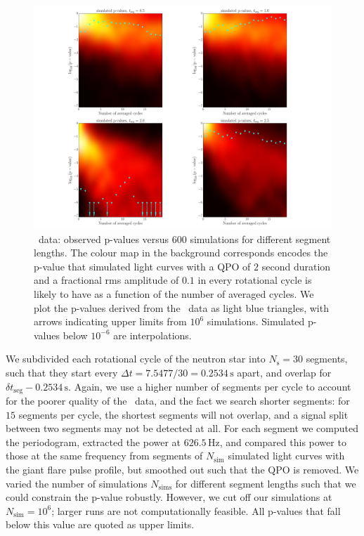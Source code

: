\documentclass{emulateapj}
\begin{document}
\begin{figure}[htbp]
\begin{center}
\includegraphics[width=1.1\textwidth]{f8.pdf}
\caption{\rhessi\ data: observed p-values versus $600$ simulations for different segment lengths. The colour map in the background corresponds encodes the p-value that simulated light curves with a QPO of $2$ second duration and a fractional rms amplitude of $0.1$ in every rotational cycle is likely to have as a function of the number of averaged cycles. We plot the p-values derived from the \rhessi\ data as light blue triangles, with arrows indicating upper limits from $10^{6}$ simulations. Simulated p-values below $10^{-6}$ are interpolations.}
\label{fig:rhessi_sims1_pvalues}
\end{center}
\end{figure}
We subdivided each rotational cycle of the neutron star into $N_\mathrm{s} = 30$ segments, such that they start every $\Delta t = 7.5477/30 = 0.2534 \, \mathrm{s}$ apart, and overlap for $\delta t_\mathrm{seg} - 0.2534 \, \mathrm{s}$. Again, we use a higher number of segments per cycle to account for the poorer quality of the \rhessi\ data, and the fact we search shorter segments: for $15$ segments per cycle, the shortest segments will not overlap, and a signal split between two segments may not be detected at all.
For each segment we computed the periodogram, extracted the power at $626.5 \, \mathrm{Hz}$, and compared this power to those at the same frequency from segments of $N_{\mathrm{sim}}$ simulated light curves with the giant flare pulse profile, but smoothed out such that the QPO is removed. We varied the number of simulations $N_\mathrm{sims}$ for different segment lengths such that we could constrain the p-value robustly. However, we cut off our simulations at $N_\mathrm{sim} = 10^{6}$; larger runs are not computationally feasible. All p-values that fall below this value are quoted as upper limits.
\end{document}
